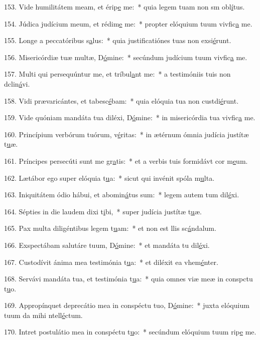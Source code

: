 153. Vide humilitátem meam, et érip\uline{e} me:~* quia legem tuam non sm obl\uline{í}tus.\par 
154. Júdica judícium meum, et rédim\uline{e} me:~* propter elóquium tuum vivfic\uline{a} me.\par 
155. Longe a peccatóribus s\uline{a}lus:~* quia justificatiónes tuas non exsi\uline{é}runt.\par 
156. Misericórdiæ tuæ multæ, D\uline{ó}mine:~* secúndum judícium tuum vivfic\uline{a} me.\par 
157. Multi qui persequúntur me, et tríbul\uline{a}nt me:~* a testimóniis tuis non dclin\uline{á}vi.\par 
158. Vidi prævaricántes, et tabesc\uline{é}bam:~* quia elóquia tua non custdi\uline{é}runt.\par 
159. Vide quóniam mandáta tua diléxi, D\uline{ó}mine:~* in misericórdia tua vivfic\uline{a} me.\par 
160. Princípium verbórum tuórum, v\uline{é}ritas:~* in ætérnum ómnia judícia justítæ t\uline{u}æ.\par 
161. Príncipes persecúti sunt me gr\uline{a}tis:~* et a verbis tuis formidávt cor m\uline{e}um.\par 
162. Lætábor ego super elóquia t\uline{u}a:~* sicut qui invénit spóla m\uline{u}lta.\par 
163. Iniquitátem ódio hábui, et abomin\uline{á}tus sum:~* legem autem tum dil\uline{é}xi.\par 
164. Sépties in die laudem dixi t\uline{i}bi,~* super judícia justítæ t\uline{u}æ.\par 
165. Pax multa diligéntibus legem t\uline{u}am:~* et non est llis sc\uline{á}ndalum.\par 
166. Exspectábam salutáre tuum, D\uline{ó}mine:~* et mandáta tu dil\uline{é}xi.\par 
167. Custodívit ánima mea testimónia t\uline{u}a:~* et diléxit ea vhem\uline{é}nter.\par 
168. Servávi mandáta tua, et testimónia t\uline{u}a:~* quia omnes viæ meæ in conspctu t\uline{u}o.\par 
169. Appropínquet deprecátio mea in conspéctu tuo, D\uline{ó}mine:~* juxta elóquium tuum da mihi ntell\uline{é}ctum.\par 
170. Intret postulátio mea in conspéctu t\uline{u}o:~* secúndum elóquium tuum rip\uline{e} me.\par 
